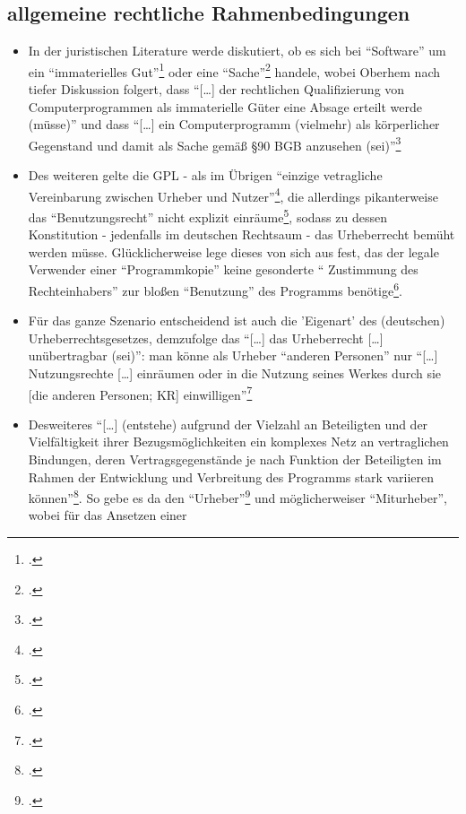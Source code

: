 \documentclass[DIV=calc,BCOR=5mm,11pt,headings=small,oneside,abstract=true, toc=bib]{scrartcl}
\begin{document}
\subsection{allgemeine rechtliche Rahmenbedingungen}
\begin{itemize}
  \item In der juristischen Literature werde diskutiert, ob es sich bei
  \enquote{Software} um ein \enquote{immaterielles
  Gut}\footcite[vgl.][53f]{Oberhem2008a} oder eine
  \enquote{Sache}\footcite[vgl.][55f]{Oberhem2008a} handele, wobei Oberhem
  nach tiefer Diskussion folgert, dass \enquote{[\ldots] der rechtlichen
  Qualifizierung von Computerprogrammen als immaterielle Güter eine Absage
  erteilt werde (müsse)} und dass \enquote{[\ldots] ein
  Computerprogramm (vielmehr) als  körperlicher Gegenstand und damit als
  Sache gemäß §90 BGB anzusehen (sei)}\footcite[vgl.][67f]{Oberhem2008a}
  \item Des weiteren gelte die GPL - als im Übrigen \enquote{einzige
  vetragliche Vereinbarung zwischen Urheber und
  Nutzer}\footcite[vgl.][71]{Oberhem2008a}, die allerdings pikanterweise
  das \enquote{Benutzungsrecht} nicht explizit
  einräume\footcite[vgl.][72]{Oberhem2008a}, sodass zu dessen Konstitution -
  jedenfalls im deutschen Rechtsaum -  das Urheberrecht bemüht werden müsse.
  Glücklicherweise lege dieses von sich aus fest, das der legale Verwender einer
  \enquote{Programmkopie} keine gesonderte \enquote{ Zustimmung des
  Rechteinhabers} zur bloßen \enquote{Benutzung} des Programms
  benötige\footcite[vgl.][73]{Oberhem2008a}.
  \item Für das ganze Szenario entscheidend ist auch die 'Eigenart' des
  (deutschen) Urheberrechtsgesetzes, demzufolge das \enquote{[\ldots] das
  Urheberrecht [\ldots] unübertragbar (sei)}: man könne als Urheber
  \enquote{anderen Personen} nur \enquote{[\ldots] Nutzungsrechte [\ldots]
  einräumen oder in die Nutzung seines Werkes durch sie [die anderen
  Personen; KR] einwilligen}\footcite[vgl.][75]{Oberhem2008a}
  \item Desweiteres \enquote{[\ldots] (entstehe) aufgrund der Vielzahl an
  Beteiligten und der Vielfältigkeit ihrer Bezugsmöglichkeiten ein
  komplexes Netz an vertraglichen Bindungen, deren Vertragsgegenstände je
  nach Funktion der Beteiligten im Rahmen der Entwicklung und Verbreitung
  des Programms stark variieren können}\footcite[vgl.][89]{Oberhem2008a}.
  So gebe es da den \enquote{Urheber}\footcite[vgl.][78]{Oberhem2008a} und
  möglicherweiser \enquote{Miturheber}, wobei für das Ansetzen einer

\end{itemize}
\end{document}
